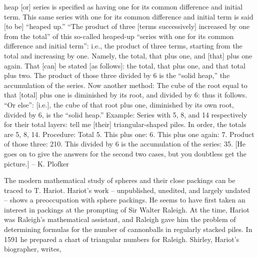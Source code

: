 { {\narrower
    [This] heap [or] series is specified as having one for its common
 difference and initial term. This same series with one for its common
 difference and initial term is said [to be] ``heaped up.'' ``The
 product of three [terms successively] increased by one from the total''
 of this so-called heaped-up ``series with one for its common
 difference and initial term'': i.e., the product of three terms, starting
 from the total and increasing by one. Namely, the total, that plus one,
 and [that] plus one again. That [can] be stated [as follows]: the total,
 that plus one, and that total plus two. The product of those three
 divided by 6 is the ``solid heap,'' the accumulation of the series.
 Now another method: The cube of the root equal to that [total] plus
 one is diminished by its root, and divided by 6: thus it follows.
 ``Or else'': [i.e.], the cube of that root plus one, diminished by
 its own root, divided by 6, is the ``solid heap.''
    Example: Series with 5, 8, and 14 respectively for their total layers:
 tell me [their] triangular-shaped piles.
    In order, the totals are 5, 8, 14.
    Procedure: Total 5. This plus one: 6. This plus one again: 7. Product
 of those three: 210. This divided by 6 is the accumulation of the series:
 35.
    [He goes on to give the answers for the second two cases, but you
 doubtless get the picture.]   --  K. Plofker
 }


}



The modern mathematical study of spheres and their close packings can be
traced to T. Hariot.  
Hariot's work -- unpublished, unedited,
and largely undated -- shows a preoccupation with sphere packings.
He seems to have first taken an interest in packings at the
prompting of Sir Walter Raleigh.  
At the time, Hariot was Raleigh's
mathematical assistant,  and Raleigh gave him the problem of determining
formulas for the number of cannonballs in regularly stacked piles.
In 1591 he prepared a chart of triangular numbers for Raleigh.
Shirley, Hariot's biographer, writes,

